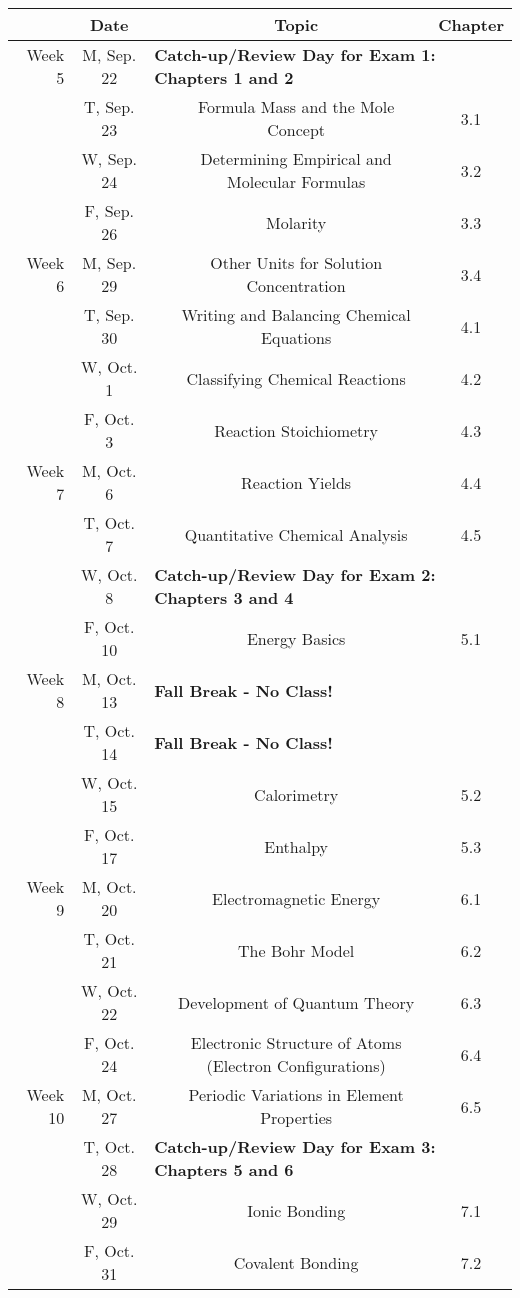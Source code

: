 \documentclass[12pt, letterpaper]{article}
\begin{document}
\noindent
\begin{tabular}{rcccc}
& Date && Topic & Chapter\\
\midrule
Week 5 & M, Sep. 22& \multicolumn{3}{l}{\textbf{Catch-up/Review Day for Exam 1: Chapters 1 and 2}}\\
& T, Sep. 23&& Formula Mass and the Mole Concept & 3.1\\
& W, Sep. 24&& Determining Empirical and Molecular Formulas & 3.2\\
& F, Sep. 26&& Molarity & 3.3\\
\midrule
Week 6 & M, Sep. 29&& Other Units for Solution Concentration & 3.4\\
& T, Sep. 30&& Writing and Balancing Chemical Equations & 4.1\\
& W, Oct. 1&& Classifying Chemical Reactions & 4.2\\
& F, Oct. 3&& Reaction Stoichiometry & 4.3\\
\midrule
Week 7 & M, Oct. 6&& Reaction Yields & 4.4\\
& T, Oct. 7&& Quantitative Chemical Analysis & 4.5\\
& W, Oct. 8& \multicolumn{3}{l}{\textbf{Catch-up/Review Day for Exam 2: Chapters 3 and 4}}\\
& F, Oct. 10&& Energy Basics & 5.1\\
\midrule
Week 8 & M, Oct. 13& \multicolumn{3}{l}{\textbf{Fall Break - No Class!}}\\
& T, Oct. 14& \multicolumn{3}{l}{\textbf{Fall Break - No Class!}}\\
& W, Oct. 15&& Calorimetry & 5.2\\
& F, Oct. 17&& Enthalpy & 5.3\\
\midrule
Week 9 & M, Oct. 20&& Electromagnetic Energy & 6.1\\
& T, Oct. 21&& The Bohr Model & 6.2\\
& W, Oct. 22&& Development of Quantum Theory & 6.3\\
& F, Oct. 24&& Electronic Structure of Atoms (Electron Configurations) & 6.4\\
\midrule
Week 10 & M, Oct. 27&& Periodic Variations in Element Properties & 6.5\\
& T, Oct. 28& \multicolumn{3}{l}{\textbf{Catch-up/Review Day for Exam 3: Chapters 5 and 6}}\\
& W, Oct. 29&& Ionic Bonding & 7.1\\
& F, Oct. 31&& Covalent Bonding & 7.2\\
\end{tabular}
\end{document}
